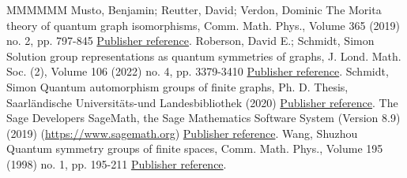 \documentclass[11pt]{article}
\theoremstyle{definition}
\numberwithin{equation}{section}
\begin{document}
\begin{thebibliography}{MMMMMM}
 Musto, Benjamin; Reutter, David; Verdon, Dominic The Morita theory of quantum graph isomorphisms, Comm. Math. Phys., Volume 365 (2019) no. 2, pp. 797-845 \href{https://alco.centre-mersenne.org/articles/10.5802/alco.335/#MRV}{Publisher reference}.
 Roberson, David E.; Schmidt, Simon Solution group representations as quantum symmetries of graphs, J. Lond. Math. Soc. (2), Volume 106 (2022) no. 4, pp. 3379-3410 \href{https://alco.centre-mersenne.org/articles/10.5802/alco.335/#RS}{Publisher reference}.
 Schmidt, Simon Quantum automorphism groups of finite graphs, Ph. D. Thesis, Saarländische Universitäts-und Landesbibliothek (2020) \href{https://alco.centre-mersenne.org/articles/10.5802/alco.335/#Sthesis}{Publisher reference}.
 The Sage Developers SageMath, the Sage Mathematics Software System (Version 8.9) (2019) (\url{https://www.sagemath.org}) \href{https://alco.centre-mersenne.org/articles/10.5802/alco.335/#sagemath}{Publisher reference}.
 Wang, Shuzhou Quantum symmetry groups of finite spaces, Comm. Math. Phys., Volume 195 (1998) no. 1, pp. 195-211 \href{https://alco.centre-mersenne.org/articles/10.5802/alco.335/#WanSn}{Publisher reference}.
\end{thebibliography}
\end{document}
